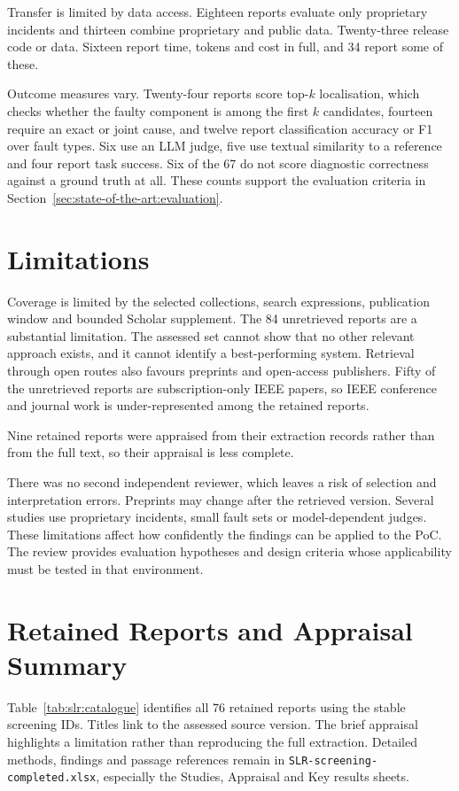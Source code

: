 Transfer is limited by data access. Eighteen reports evaluate only
proprietary incidents and thirteen combine proprietary and public data.
Twenty-three release code or data. Sixteen report time, tokens and cost
in full, and 34 report some of these.

Outcome measures vary. Twenty-four reports score top-$k$ localisation,
which checks whether the faulty component is among the first $k$ candidates,
fourteen require an exact or joint cause, and twelve report classification
accuracy or F1 over fault types. Six use an LLM judge, five use textual
similarity to a reference and four report task success. Six of the 67 do
not score diagnostic correctness against a ground truth at all. These
counts support the evaluation criteria in
Section~\ref{sec:state-of-the-art:evaluation}.

\section{Limitations}
\label{sec:slr:limitations}

Coverage is limited by the selected collections, search expressions,
publication window and bounded Scholar supplement. The 84 unretrieved
reports are a substantial limitation. The assessed set cannot show that no
other relevant approach exists, and it cannot identify a best-performing
system. Retrieval through open routes also favours preprints and
open-access publishers. Fifty of the unretrieved reports are
subscription-only IEEE papers, so IEEE conference and journal work is
under-represented among the retained reports.

Nine retained reports were appraised from their extraction records rather
than from the full text, so their appraisal is less complete.

There was no second independent reviewer, which leaves a risk of selection
and interpretation errors. Preprints may change after the retrieved version.
Several studies use proprietary incidents, small fault sets or
model-dependent judges. These limitations affect how confidently the
findings can be applied to the PoC. The review provides evaluation
hypotheses and design criteria whose applicability must be tested in that
environment.

\section{Retained Reports and Appraisal Summary}

Table~\ref{tab:slr:catalogue} identifies all 76 retained reports using the
stable screening IDs. Titles link to the assessed source version. The
brief appraisal highlights a limitation rather than reproducing the full
extraction. Detailed methods, findings and passage references remain in
\texttt{SLR-screening-completed.xlsx}, especially the Studies, Appraisal and
Key results sheets.

